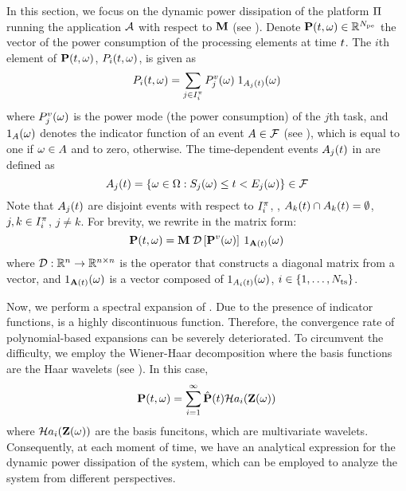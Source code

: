 In this section, we focus on the dynamic power dissipation of the platform $\Pi$ running the application $\mathcal{A}$ with respect to $\mathbf{M}$ (see ). Denote $\mathbf{P}(t, \omega) \in \mathbb{R}^{N_\text{pe}}$ the vector of the power consumption of the processing elements at time $t$. The $i$th element of $\mathbf{P}(t, \omega)$, $P_i(t, \omega)$, is given as
\begin{equation} \elabel{processor-power}
  \PP_i(\t, \o) = \sum_{j \in \index^\pi_i} \PT_j(\o) \; \I_{\event_j(\t)}(\o)
\end{equation}
where $P^v_j(\omega)$ is the power mode (the power consumption) of the $j$th task, and $1_A(\omega)$ denotes the indicator function of an event $A \in \mathcal{F}$ (see ), which is equal to one if $\omega \in A$ and to zero, otherwise. The time-dependent events $A_j(t)$ in  are defined as
\[
  A_j(t) = \{ \omega \in \Omega: S_j(\omega) \leq t < E_j(\omega) \} \in \mathcal{F}
\]
Note that $A_j(t)$ are disjoint events with respect to $I^\pi_i$, \ie, $A_k(t) \cap A_k(t) = \emptyset$, $j, k \in I^\pi_i$, $j \neq k$. For brevity, we rewrite  in the matrix form:
\begin{equation} \elabel{platform-power}
  \vPP(\t, \o) = \mM \; \oDiag{\vPT(\o)} \: \I_{\m{\event}(\t)}(\o)
\end{equation}
where $\oDiag: \real^n \to \real^{n \times n}$ is the operator that constructs a diagonal matrix from a vector, and $1_{\mathbf{A}(t)}(\omega)$ is a vector composed of $1_{A_i(t)}(\omega)$, $i \in \{ 1, \dots, {N_\text{ts}} \}$.

Now, we perform a spectral expansion of . Due to the presence of indicator functions,  is a highly discontinuous function. Therefore, the convergence rate of polynomial-based expansions can be severely deteriorated. To circumvent the difficulty, we employ the Wiener-Haar decomposition \cite{maitre2004} where the basis functions are the Haar wavelets (see ). In this case,
\[
  \mathbf{P}(t, \omega) = \sum_{i = 1}^\infty \hat{\mathbf{P}}(t) \mathcal{H}a_i(\mathbf{Z}(\omega))
\]
where $\mathcal{H}a_i(\mathbf{Z}(\omega))$ are the basis funcitons, which are multivariate wavelets. Consequently, at each moment of time, we have an analytical expression for the dynamic power dissipation of the system, which can be employed to analyze the system from different perspectives.

